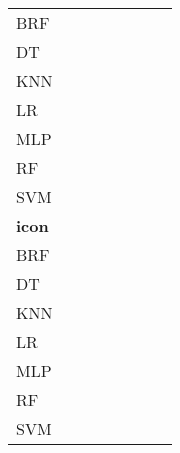 \documentclass{article}
\begin{document}
{\begin{tabular}{|l|c|c|c|c|c|c|c|}
BRF & \cellcolor{gray}  & \cellcolor{white}  & \cellcolor{white}  & \cellcolor{black}  & \cellcolor{black}  & \cellcolor{white}  & \cellcolor{white}  \\ 
DT & \cellcolor{white}  & \cellcolor{gray}  & \cellcolor{white}  & \cellcolor{black}  & \cellcolor{black}  & \cellcolor{white}  & \cellcolor{white}  \\ 
KNN & \cellcolor{white}  & \cellcolor{black}  & \cellcolor{gray}  & \cellcolor{black}  & \cellcolor{white}  & \cellcolor{white}  & \cellcolor{black}  \\ 
LR & \cellcolor{white}  & \cellcolor{white}  & \cellcolor{white}  & \cellcolor{gray}  & \cellcolor{white}  & \cellcolor{white}  & \cellcolor{white}  \\ 
MLP & \cellcolor{white}  & \cellcolor{white}  & \cellcolor{white}  & \cellcolor{white}  & \cellcolor{gray}  & \cellcolor{white}  & \cellcolor{white}  \\ 
RF & \cellcolor{white}  & \cellcolor{white}  & \cellcolor{white}  & \cellcolor{black}  & \cellcolor{black}  & \cellcolor{gray}  & \cellcolor{white}  \\ 
SVM & \cellcolor{white}  & \cellcolor{white}  & \cellcolor{white}  & \cellcolor{white}  & \cellcolor{white}  & \cellcolor{white}  & \cellcolor{gray}  \\ 
\hline
\textbf{icon} \\ \hline
BRF & \cellcolor{gray}  & \cellcolor{white}  & \cellcolor{white}  & \cellcolor{white}  & \cellcolor{white}  & \cellcolor{white}  & \cellcolor{white}  \\ 
DT & \cellcolor{white}  & \cellcolor{gray}  & \cellcolor{white}  & \cellcolor{white}  & \cellcolor{white}  & \cellcolor{white}  & \cellcolor{white}  \\ 
KNN & \cellcolor{white}  & \cellcolor{white}  & \cellcolor{gray}  & \cellcolor{black}  & \cellcolor{black}  & \cellcolor{black}  & \cellcolor{white}  \\ 
LR & \cellcolor{white}  & \cellcolor{white}  & \cellcolor{white}  & \cellcolor{gray}  & \cellcolor{white}  & \cellcolor{white}  & \cellcolor{white}  \\ 
MLP & \cellcolor{white}  & \cellcolor{white}  & \cellcolor{white}  & \cellcolor{white}  & \cellcolor{gray}  & \cellcolor{white}  & \cellcolor{white}  \\ 
RF & \cellcolor{white}  & \cellcolor{white}  & \cellcolor{white}  & \cellcolor{white}  & \cellcolor{white}  & \cellcolor{gray}  & \cellcolor{white}  \\ 
SVM & \cellcolor{black}  & \cellcolor{black}  & \cellcolor{white}  & \cellcolor{white}  & \cellcolor{white}  & \cellcolor{black}  & \cellcolor{gray}  \\ 

\end{tabular}}
\end{document}
